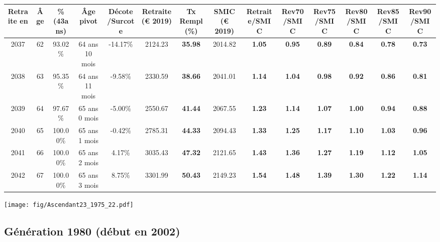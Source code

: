 \begin{adjustbox}{max width=\textwidth} 
\begin{tabular}[htb]{|c|c||c|c|c||c|c||c||c|c|c|c|c|c|} 
\hline 
 Retraite en &  Âge &  \%(43ans) &  Âge pivot &  Décote/Surcote &  Retraite (\euro{} 2019) &  Tx Rempl(\%) &  SMIC (\euro{} 2019) &  Retraite/SMIC &  Rev70/SMIC &  Rev75/SMIC &  Rev80/SMIC &  Rev85/SMIC &  Rev90/SMIC \\ 
\hline \hline 
 2037 &  62 &  93.02\% &  64 ans 10 mois &  -14.17\% &  2124.23 &  {\bf 35.98} &  2014.82 &  {\bf 1.05} &  {\bf {\color{red} 0.95}} &  {\bf {\color{red} 0.89}} &  {\bf {\color{red} 0.84}} &  {\bf {\color{red} 0.78}} &  {\bf {\color{red} 0.73}} \\ 
\hline 
 2038 &  63 &  95.35\% &  64 ans 11 mois &  -9.58\% &  2330.59 &  {\bf 38.66} &  2041.01 &  {\bf 1.14} &  {\bf 1.04} &  {\bf {\color{red} 0.98}} &  {\bf {\color{red} 0.92}} &  {\bf {\color{red} 0.86}} &  {\bf {\color{red} 0.81}} \\ 
\hline 
 2039 &  64 &  97.67\% &  65 ans 0 mois &  -5.00\% &  2550.67 &  {\bf 41.44} &  2067.55 &  {\bf 1.23} &  {\bf 1.14} &  {\bf 1.07} &  {\bf 1.00} &  {\bf {\color{red} 0.94}} &  {\bf {\color{red} 0.88}} \\ 
\hline 
 2040 &  65 &  100.00\% &  65 ans 1 mois &  -0.42\% &  2785.31 &  {\bf 44.33} &  2094.43 &  {\bf 1.33} &  {\bf 1.25} &  {\bf 1.17} &  {\bf 1.10} &  {\bf 1.03} &  {\bf {\color{red} 0.96}} \\ 
\hline 
 2041 &  66 &  100.00\% &  65 ans 2 mois &  4.17\% &  3035.43 &  {\bf 47.32} &  2121.65 &  {\bf 1.43} &  {\bf 1.36} &  {\bf 1.27} &  {\bf 1.19} &  {\bf 1.12} &  {\bf 1.05} \\ 
\hline 
 2042 &  67 &  100.00\% &  65 ans 3 mois &  8.75\% &  3301.99 &  {\bf 50.43} &  2149.23 &  {\bf 1.54} &  {\bf 1.48} &  {\bf 1.39} &  {\bf 1.30} &  {\bf 1.22} &  {\bf 1.14} \\ 
\hline 
\hline 
\end{tabular} 
\end{adjustbox} 
 
 \vspace{0.1cm} 

 \begin{center}\texttt{[image: fig/Ascendant23\_1975\_22.pdf]}\end{center} \label{fig/Ascendant23_1975_22.pdf} 

\newpage 
 
\subsection{Génération 1980 (début en 2002)} 

